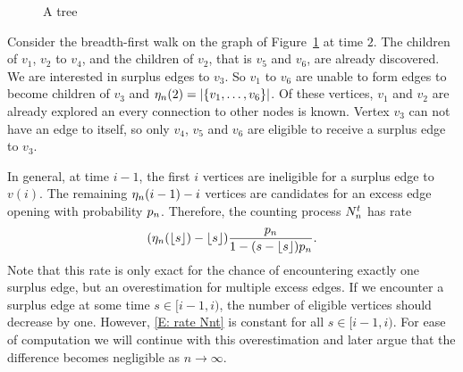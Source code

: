 \begin{figure}[ht]
	
	\caption{A tree} 
	\label{F: Surplus Edges Tree}
\end{figure}

Consider the breadth-first walk on the graph of Figure~\ref{F: Surplus Edges Tree} at time $2$.
The children of $v_1$, $v_2$ to $v_4$, and the children of $v_2$, that is $v_5$ and $v_6$, are already discovered.
We are interested in surplus edges to $v_3$.
So $v_1$ to $v_6$ are unable to form edges to become children of $v_3$ and $\eta_n(2) = |\{ v_1, \dots,  v_6\}|$.
Of these vertices, $v_1$ and $v_2$ are already explored an every connection to other nodes is known.
Vertex $v_3$ can not have an edge to itself, so only $v_4$, $v_5$ and $v_6$ are eligible to receive a surplus edge to $v_3$.

In general, at time $i-1$, the first $i$ vertices are ineligible for a surplus edge to $v(i)$.
The remaining $\eta_n(i-1) - i$ vertices are candidates for an excess edge opening with probability $p_n$.
Therefore, the counting process $N_n^t$ has rate
\begin{equation} \label{E: rate Nnt}
(\eta_n(\lfloor s\rfloor) - \lfloor s\rfloor) \frac{p_n}{1-(s-\lfloor s\rfloor)p_n}.
\end{equation}
Note that this rate is only exact for the chance of encountering exactly one surplus edge, 
but an overestimation for multiple excess edges.
If we encounter a surplus edge at some time $s \in [i-1, i)$,
the number of eligible vertices should decrease by one.
However, \eqref{E: rate Nnt} is constant for all $s \in [i-1, i)$.
For ease of computation we will continue with this overestimation and later argue that the difference becomes negligible as $n \rightarrow \infty$.

